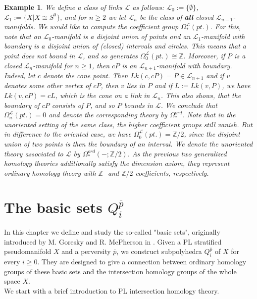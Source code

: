 \documentclass{scrreprt}
\newtheorem{example}[prop]{Example}
\begin{document}
\begin{example}\label{ordinaryhomologyexample}
We define a class of links $\mathcal{L}$ as follows: $\mathcal{L}_0 := \{ \emptyset \}$, $\mathcal{L}_1 := \{ X|X \cong S^0 \}$, and for $n \geq 2$ we let $\mathcal{L}_n$ be the class of \textbf{all} closed $\mathcal{L}_{n-1}$-manifolds. We would like to compute the coefficient group $\Omega_*^{\mathcal{L}}(pt.)$. For this, note that an $\mathcal{L}_0$-manifold is a disjoint union of points and an $\mathcal{L}_1$-manifold with boundary is a disjoint union of (closed) intervals and circles. This means that a point does not bound in $\mathcal{L}$, and so generates 
$\Omega_0^{\mathcal{L}}(pt.) \cong \mathbb{Z}.$ Moreover, if $P$ is a closed $\mathcal{L}_n$-manifold for $n \geq 1$, then $cP$ is an $\mathcal{L}_{n+1}$-manifold with boundary. Indeed, let $c$ denote the cone point. Then $Lk(c,cP)=P \in \mathcal{L}_{n+1}$ and if $v$ denotes some other vertex of $cP$, then $v$ lies in $P$ and if $L:=Lk(v,P)$, we have $Lk(v,cP)=cL$, which is the cone on a link in $\mathcal{L}_n$. This also shows, that the boundary of $cP$ consists of $P$, and so $P$ bounds in $\mathcal{L}$. We conclude that $\Omega_n^{\mathcal{L}}(pt.)=0$ and denote the corresponding theory by $\Omega_*^{ord}$. Note that in the unoriented setting of the same class, the higher coefficient groups still vanish. But in difference to the oriented case, we have $\Omega_0^{\underline{\mathcal{L}}}(pt.)= \mathbb{Z}/2$, since the disjoint union of two points is then the boundary of an interval. We denote the unoriented theory associated to $\mathcal{L}$ by $\Omega_*^{ord}(-; \mathbb{Z}/2)$. As the previous two generalized homology theories additionally satisfy the dimension axiom, they represent ordinary homology theory with $\mathbb{Z}$- and $\mathbb{Z}/2$-coefficients, respectively.
\end{example}

\chapter{The basic sets $Q_i^{\overline{p}}$}\label{basicsetschapter}
In this chapter we define and study the so-called "basic sets", originally introduced by M. Goresky and R. McPherson in \cite{GM}. Given a PL stratified pseudomanifold $X$ and a perversity $\overline{p}$, we construct subpolyhedra $Q_i^{\overline{p}}$ of $X$ for every $i \geq 0$. They are designed to give a connection between ordinary homology groups of these basic sets and the intersection homology groups of the whole space $X$. \\
We start with a brief introduction to PL intersection homology theory.
\end{document}
